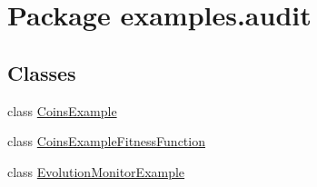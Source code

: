 \hypertarget{namespaceexamples_1_1audit}{\section{Package examples.\-audit}
\label{namespaceexamples_1_1audit}
}
\subsection*{Classes}
\begin{DoxyCompactItemize}
\item 
class \hyperlink{classexamples_1_1audit_1_1_coins_example}{Coins\-Example}
\item 
class \hyperlink{classexamples_1_1audit_1_1_coins_example_fitness_function}{Coins\-Example\-Fitness\-Function}
\item 
class \hyperlink{classexamples_1_1audit_1_1_evolution_monitor_example}{Evolution\-Monitor\-Example}
\end{DoxyCompactItemize}
